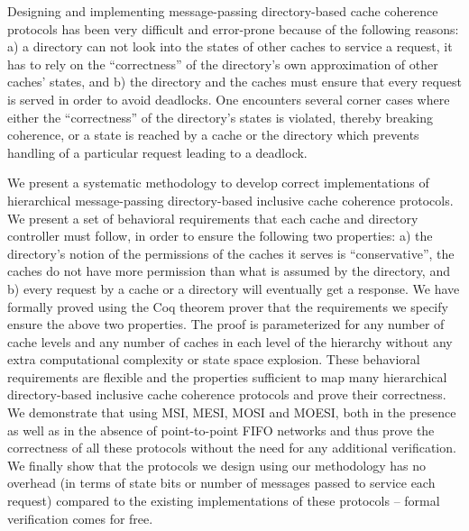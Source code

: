Designing and implementing message-passing directory-based cache coherence
protocols has been very difficult and error-prone because of the following
reasons: a) a directory can not look into the states of other caches to service
a request, it has to rely on the ``correctness'' of the directory's own
approximation of other caches' states, and b) the directory and the caches must
ensure that every request is served in order to avoid deadlocks. One encounters
several corner cases where either the ``correctness'' of the directory's states
is violated, thereby breaking coherence, or a state is reached by a cache or the
directory which prevents handling of a particular request leading to a
deadlock.%

We present a systematic methodology to develop correct implementations of
hierarchical message-passing directory-based inclusive cache coherence
protocols. We present a set of behavioral requirements that each cache and
directory controller must follow, in order to ensure the following two
properties: a) the directory's notion of the permissions of the caches it serves
is ``conservative'', \ie the caches do not have more permission than what is
assumed by the directory, and b) every request by a cache or a directory will
eventually get a response. We have formally proved using the Coq theorem prover
that the requirements we specify ensure the above two properties. The proof is
parameterized for any number of cache levels and any number of caches in each
level of the hierarchy without any extra computational complexity or state space
explosion. These behavioral requirements are flexible and the properties
sufficient to map many hierarchical directory-based inclusive cache coherence
protocols and prove their correctness. We demonstrate that using MSI, MESI,
MOSI and MOESI, both in the presence as well as in the absence of point-to-point
FIFO networks and thus prove the correctness of all these protocols without the
need for any additional verification. We finally show that the protocols we
design using our methodology has no overhead (in terms of state bits or number
of messages passed to service each request) compared to the existing
implementations of these protocols -- formal verification comes for free.
